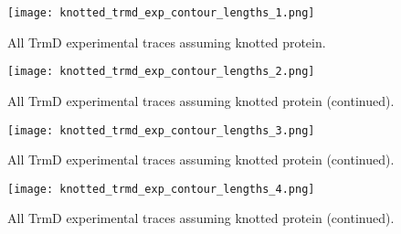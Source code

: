 \begin{figure}
    \centering
    \texttt{[image: knotted\_trmd\_exp\_contour\_lengths\_1.png]}
    \caption{All TrmD experimental traces assuming knotted protein.}
    \label{fig:knotted-trmd-exp-cl1}
\end{figure}

\begin{figure}
    \centering
    \texttt{[image: knotted\_trmd\_exp\_contour\_lengths\_2.png]}
    \caption{All TrmD experimental traces assuming knotted protein (continued).}
    \label{fig:knotted-trmd-exp-cl2}
\end{figure}

\begin{figure}
    \centering
    \texttt{[image: knotted\_trmd\_exp\_contour\_lengths\_3.png]}
    \caption{All TrmD experimental traces assuming knotted protein (continued).}
    \label{fig:knotted-trmd-exp-cl3}
\end{figure}

\begin{figure}
    \centering
    \texttt{[image: knotted\_trmd\_exp\_contour\_lengths\_4.png]}
    \caption{All TrmD experimental traces assuming knotted protein (continued).}
    \label{fig:knotted-trmd-exp-cl4}
\end{figure}

